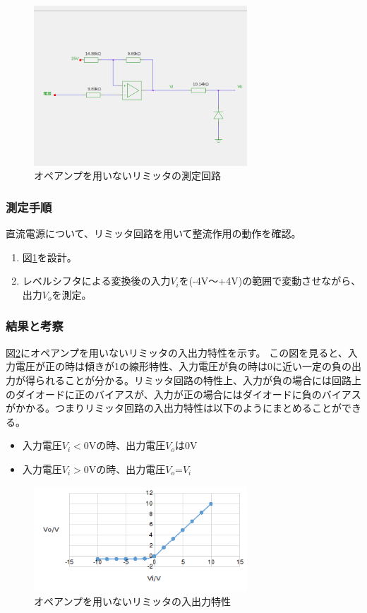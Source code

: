 \documentclass[11pt,a4j]{jsarticle}
\begin{document}
    
    \begin{figure}[htbp]
  \centering
  \includegraphics[width=8cm,clip]{noamp_tokusei.png}
  \caption{オペアンプを用いないリミッタの測定回路}
  \label{fig:noamp_tokusei}
 \end{figure}%
    
   \subsubsection{測定手順}
    直流電源について、リミッタ回路を用いて整流作用の動作を確認。
    \begin{enumerate}
    \item 図\ref{fig:noamp_tokusei}を設計。
    \item レベルシフタによる変換後の入力$V_i$を(-4V～+4V)の範囲で変動させながら、出力$V_o$を測定。
    \end{enumerate}
    
   \subsubsection{結果と考察}
    図\ref{fig:1_1_noamp_PS}にオペアンプを用いないリミッタの入出力特性を示す。
    この図を見ると、入力電圧が正の時は傾きが1の線形特性、入力電圧が負の時は0に近い一定の負の出力が得られることが分かる。リミッタ回路の特性上、入力が負の場合には回路上のダイオードに正のバイアスが、入力が正の場合にはダイオードに負のバイアスがかかる。つまりリミッタ回路の入出力特性は以下のようにまとめることができる。
    \begin{itemize}
    \item 入力電圧$V_i < 0$Vの時、出力電圧$V_o$は0V
    \item 入力電圧$V_i > 0$Vの時、出力電圧$V_o$=$V_i$
    \end{itemize}
    
    
    \begin{figure}[htbp]
  \centering
  \includegraphics[width=8cm,clip]{1_1_noamp_PS.png}
  \caption{オペアンプを用いないリミッタの入出力特性}
  \label{fig:1_1_noamp_PS}
 \end{figure}%
    
\end{document}
